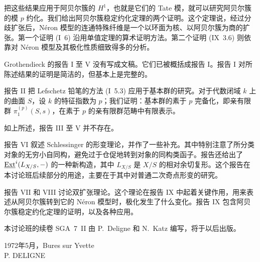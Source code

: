 把这些结果应用于阿贝尔簇的 $H^1$，也就是它们的 Tate 模，就可以研究阿贝尔簇的模 $p$ 约化。我们给出阿贝尔簇稳定约化定理的两个证明。这个定理说，经过分歧扩张后，N\'eron 模型的连通特殊纤维是一个以环面为核、以阿贝尔簇为商的扩张。第一个证明 (I~6) 沿用单值定理的算术证明方法。第二个证明 (IX~3.6) 则依靠对 N\'eron 模型及其极化性质细致得多的分析。

Grothendieck 的报告 I 至 V 没有写成文稿。它们已被概括成报告 I。报告 I 对所陈述结果的证明是简洁的，但基本上是完整的。

报告 II 把 Lefschetz 铅笔的方法 (I~5.3) 应用于基本群的研究。对于代数闭域 $k$ 上的曲面 $S$，设 $k$ 的特征指数为 $p$；我们证明：基本群的素于 $p$ 完备化，即亲有限群 $\pi_1^{(p)}(S,s)$，在素于 $p$ 的亲有限群范畴中有限表示。

如上所述，报告 III 至 V 并不存在。

\clearpage
报告 VI 叙述 Schlessinger 的形变理论，并作了一些补充。其中特别注意了所分类对象的无穷小自同构，避免过于仓促地转到对象的同构类函子。报告还给出了 $\underline{\Ext}^{i}(L_{X/S},-)$ 的一种新构造，其中 $L_{X/S}$ 是 $X/S$ 的相对余切复形。这个报告在本讨论班后续部分的用途，主要在于其中对普通二次奇点形变的研究。

报告 VII 和 VIII 讨论双扩张理论。这个理论在报告 IX 中起着关键作用，用来表述从阿贝尔簇转到它的 N\'eron 模型时，极化发生了什么变化。报告 IX 包含阿贝尔簇稳定约化定理的证明，以及各种应用。

本讨论班的续卷 SGA~7~II 由 P.~Deligne 和 N.~Katz 编写，将于以后出版。

\vspace{1.5em}
\begin{flushright}
1972年5月，Bures sur Yvette\\[0.5em]
P. DELIGNE
\end{flushright}
